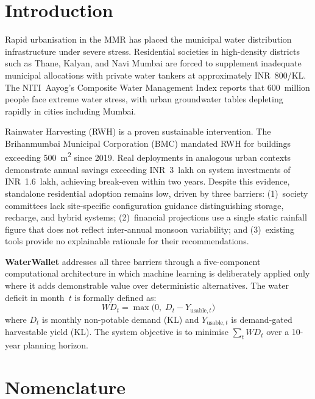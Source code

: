 \documentclass[conference]{IEEEtran}
\begin{document}
\section{Introduction}
\label{sec:intro}

Rapid urbanisation in the MMR has placed the municipal water distribution infrastructure under severe stress. Residential societies in high-density districts such as Thane, Kalyan, and Navi Mumbai are forced to supplement inadequate municipal allocations with private water tankers at approximately INR~800/KL. The NITI~Aayog's Composite Water Management Index reports that 600~million people face extreme water stress, with urban groundwater tables depleting rapidly in cities including Mumbai.

Rainwater Harvesting (RWH) is a proven sustainable intervention. The
Brihanmumbai Municipal Corporation (BMC) mandated RWH for buildings exceeding
500~m\textsuperscript{2} since 2019. Real deployments in
analogous urban contexts demonstrate annual savings exceeding INR~3~lakh on
system investments of INR~1.6~lakh, achieving break-even within two
years. Despite this evidence, standalone residential
adoption remains low, driven by three barriers: (1)~society committees lack
site-specific configuration guidance distinguishing storage, recharge, and
hybrid systems; (2)~financial projections use a single static rainfall figure
that does not reflect inter-annual monsoon variability; and (3)~existing tools
provide no explainable rationale for their recommendations.

\textbf{WaterWallet} addresses all three barriers through a five-component
computational architecture in which machine learning is deliberately applied
only where it adds demonstrable value over deterministic alternatives. The
water deficit in month~$t$ is formally defined as:
\begin{equation}
  WD_t = \max\!\bigl(0,\; D_t - Y_{\text{usable},t}\bigr)
  \label{eq:deficit}
\end{equation}
where $D_t$ is monthly non-potable demand (KL) and $Y_{\text{usable},t}$ is
demand-gated harvestable yield (KL). The system objective is to minimise
$\sum_{t} WD_t$ over a 10-year planning horizon.\\

\section{Nomenclature}
\end{document}
